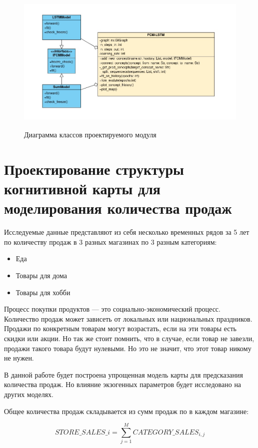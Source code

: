 \def\figurename{Рис}
\begin{figure}[t]
	\centering
	\includegraphics[height=7cm]{./img/class_diag.jpg}
	\caption{Диаграмма классов проектируемого модуля}
	\label{img:class_diag}
\end{figure}

\section{Проектирование структуры когнитивной карты для моделирования количества продаж}

Исследуемые данные представляют из себя несколько временных рядов
за 5 лет по количеству продаж в 3 разных магазинах по 3 разным категориям:

\begin{itemize}
	\item Еда
	\item Товары для дома
	\item Товары для хобби
\end{itemize}

Процесс покупки продуктов --- это социально-экономический процесс.
Количество продаж может зависеть от локальных или национальных праздников.
Продажи по конкретным товарам могут возрастать, если на эти товары есть скидки или акции.
Но так же стоит помнить, что в случае, если товар не завезли,
продажи такого товара будут нулевыми. Но это не значит, что этот товар никому не нужен.

В данной работе будет построена упрощенная модель карты для предсказания количества продаж.
Но влияние экзогенных параметров будет исследовано на других моделях.

Общее количества продаж складывается из сумм продаж
по в каждом магазине:

\begin{equation}\label{eq:sales_total_simple_model}
	STORE\_SALES\_{i} = \sum_{j=1}^{M} CATEGORY\_SALES_{i,j}
\end{equation}

